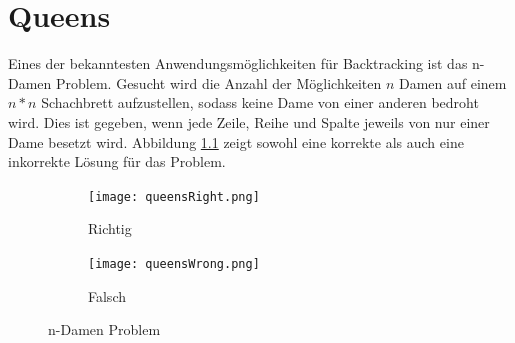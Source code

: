 \chapter{Queens}
Eines der bekanntesten Anwendungsmöglichkeiten für Backtracking ist das n-Damen Problem.
Gesucht wird die Anzahl der Möglichkeiten $n$ Damen auf einem $n * n$ Schachbrett aufzustellen, sodass
keine Dame von einer anderen bedroht wird. Dies ist gegeben, wenn jede Zeile, Reihe und Spalte jeweils von nur einer Dame
besetzt wird. Abbildung \ref{fig:n4} zeigt sowohl eine korrekte als auch eine inkorrekte Lösung für das Problem.
\begin{figure}
  \centering
  \begin{subfigure}{0.4\linewidth}
    \texttt{[image: queensRight.png]}
    \caption{Richtig}
  \end{subfigure}
  \begin{subfigure}{0.4\linewidth}
    \texttt{[image: queensWrong.png]}
    \caption{Falsch}
  \end{subfigure}
  \caption{n-Damen Problem}
  \label{fig:n4}
\end{figure}

